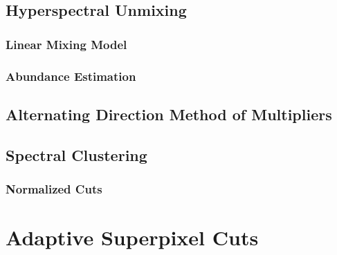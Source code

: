 \documentclass[10pt]{article}
\begin{document}
\subsection{Hyperspectral Unmixing} \label{Unmixing Intro}

\subsubsection{Linear Mixing Model}\label{LMM}

\subsubsection{Abundance Estimation}\label{AE}


\subsection{Alternating Direction Method of Multipliers}\label{ADMM Intro}

%  

\subsection{Spectral Clustering} \label{Spectral Clustering}

\subsubsection{Normalized Cuts} \label{Normalized Cuts}


\clearpage
% 
% 
% 
% 
% 
\section{Adaptive Superpixel Cuts} \label{Algorithm Intro}


\end{document}

